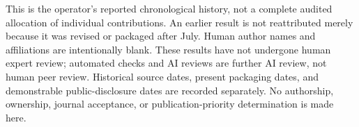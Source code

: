\documentclass[11pt,a4paper]{article}
\theoremstyle{definition}
\theoremstyle{remark}
\begin{document}
This is the operator's reported chronological history, not a complete audited
allocation of individual contributions. An earlier result is not reattributed
merely because it was revised or packaged after July. Human author names and
affiliations are intentionally blank. These results have not undergone human
expert review; automated checks and AI reviews are further AI review, not human
peer review. Historical source dates, present packaging dates, and demonstrable
public-disclosure dates are recorded separately. No authorship, ownership,
journal acceptance, or publication-priority determination is made here.



\end{document}
